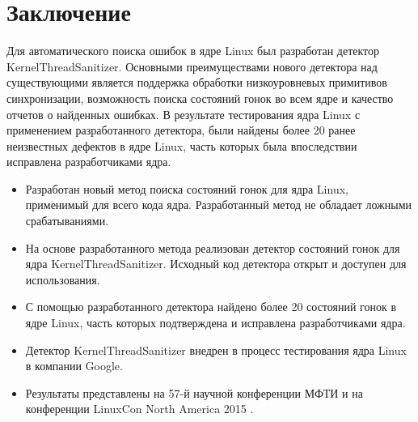 
\section{Заключение}

Для автоматического поиска ошибок в ядре Linux был разработан детектор KernelThreadSanitizer.
Основными преимуществами нового детектора над существующими является поддержка обработки низкоуровневых примитивов синхронизации, возможность поиска состояний гонок во всем ядре и качество отчетов о найденных ошибках.
В результате тестирования ядра Linux с применением разработанного детектора, были найдены более 20 ранее неизвестных дефектов в ядре Linux, часть которых была впоследствии исправлена разработчиками ядра.

\begin{itemize}
  \item Разработан новый метод поиска состояний гонок для ядра Linux, применимый для всего кода ядра. Разработанный метод не обладает ложными срабатываниями.
  \item На основе разработанного метода реализован детектор состояний гонок для ядра KernelThreadSanitizer. Исходный код детектора открыт и доступен для использования.
  \item С помощью разработанного детектора найдено более 20 состояний гонок в ядре Linux, часть которых подтверждена и исправлена разработчиками ядра.
  \item Детектор KernelThreadSanitizer внедрен в процесс тестирования ядра Linux в компании Google.
  \item Результаты представлены на 57-й научной конференции МФТИ \cite{ktsan-mipt} и на конференции LinuxCon North America 2015 \cite{kasan-linuxcon}.
\end{itemize}
